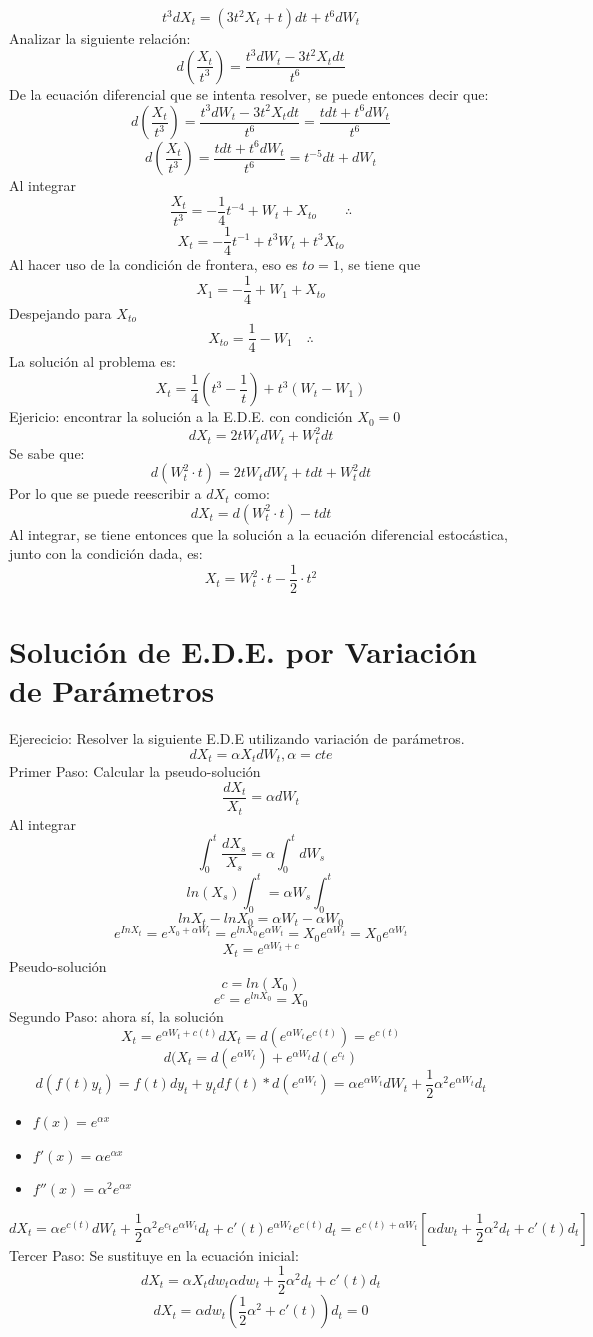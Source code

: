 \documentclass[11pt,fleqn]{book} %
\numberwithin{equation}{section} %
\numberwithin{figure}{section} %
\numberwithin{table}{section} %
\begin{document}
$$ t^3dX_t = (3t^2X_t + t)dt + t^6dW_t $$
Analizar la siguiente relación:
$$ d\left( \frac{X_t}{t^3} \right) = \frac{t^3dW_t - 3t^2X_tdt}{t^6} $$
De la ecuación diferencial que se intenta resolver, se puede entonces decir que:
$$ d\left( \frac{X_t}{t^3} \right) = \frac{t^3dW_t - 3t^2X_tdt}{t^6} = \frac{tdt + t^6dW_t}{t^6} $$
$$ d\left( \frac{X_t}{t^3} \right) =  \frac{tdt + t^6dW_t}{t^6} = t^{-5}dt + dW_t $$
Al integrar
$$ \frac{X_t}{t^3} = -\frac{1}{4}t^{-4} + W_t + X_{to} \qquad \therefore $$
$$ X_t = -\frac{1}{4}t^{-1} + t^3W_t + t^3X_{to}  $$
Al hacer uso de la condición de frontera, eso es $to = 1$, se tiene que
$$ X_1 = -\frac{1}{4} + W_1 + X_{to} $$
Despejando para $X_{to}$
$$ X_{to} = \frac{1}{4} - W_1 \quad \therefore $$
La solución al problema es:
$$ X_t = \frac{1}{4} \left( t^3 - \frac{1}{t} \right) + t^3 \left( W_t - W_1  \right) $$
Ejericio: encontrar la solución a la E.D.E. con condición $X_0 = 0$
$$ dX_t = 2tW_tdW_t + W_t^2dt $$
Se sabe que:
$$ d(W_t^2 \cdot t) = 2tW_tdW_t + tdt + W_t^2dt  $$
Por lo que se puede reescribir a $dX_t$ como:
$$ dX_t = d(W_t^2 \cdot t) - tdt $$
Al integrar, se tiene entonces que la solución a la ecuación diferencial estocástica, junto con la condición dada, es:
$$ X_t = W_t^2 \cdot t - \frac{1}{2} \cdot t^2 $$
\section{Solución de E.D.E. por Variación de Parámetros}
Ejerecicio: Resolver la siguiente E.D.E utilizando variación de parámetros.
$$dX_t=\alpha X_tdW_t, \alpha =cte$$
Primer Paso: Calcular la pseudo-solución
$$\frac{dX_t}{X_t}=\alpha dW_t$$
Al integrar
$$\int_{0}^{t}\frac{dX_s}{X_s}=\alpha\int_{0}^{t} dW_s$$
$$ln(X_s)\int_{0}^{t}=\alpha W_s\int_{0}^{t}$$
$$lnX_t-lnX_0=\alpha W_t-\alpha W_0$$
$$e^{InX_t}=e^{X_0+\alpha W_t}=e^{lnX_0}e^{\alpha W_t}=X_0e^{\alpha W_t}=X_0e^{\alpha W_t}$$
$$X_t=e^{\alpha W_t+c}$$
Pseudo-solución
$$c=ln(X_0)$$
$$e^c=e^{lnX_0}=X_0$$
Segundo Paso: ahora sí, la solución
$$ X_{t}=e^{\alpha W_{t}+c(t)}dX_t=d(e^{\alpha W_{t}} e^{c(t)}) = e^{c(t)}$$
$$ d(X_{t}= d(e^{\alpha W_t})+e^{\alpha W_t}d(e^{c_t}) $$
$$ d(f(t)y_t)=f(t)dy_t+y_tdf(t)*d(e^{\alpha W_t})=\alpha e^{\alpha W_t}dW_t+\frac{1}{2}\alpha ^2e^{\alpha W_t}d_t $$
\begin{itemize}
    \item $f(x)=e^{\alpha x}$
    \item ${f}'(x)=\alpha e^{\alpha x}$
    \item ${f}''(x)=\alpha ^2e^{\alpha x}$
\end{itemize}
$$ dX_t=\alpha e^{c(t)}dW_t+\frac{1}{2}\alpha ^2e^{c_t}e^{\alpha W_t}d_t+{c}'(t)e^{\alpha W_t}e^{c(t)}d_t =e^{c(t)+\alpha W_t}[\alpha dw_t+\frac{1}{2}\alpha ^2d_t+{c}'(t)d_t] $$
Tercer Paso: Se sustituye en la ecuación inicial:
$$ dX_t =\alpha X_{t}dw_{t} \alpha dw_t+\frac{1}{2}\alpha ^2d_t+{c}'(t)d_t $$
$$ dX_t = \alpha dw_t (\frac{1}{2}\alpha ^2+{c}'(t))d_t=0 $$
\end{document}
